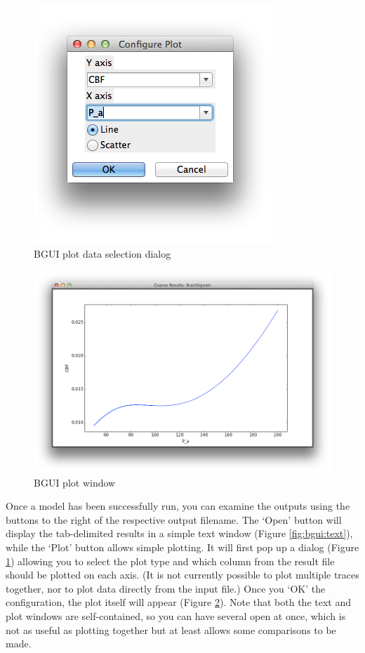 \documentclass[a4paper,11pt]{article}
\begin{document}
\begin{figure}[tbph]
\begin{center}
\includegraphics[scale=0.7]{figures/plot-select.png}
\caption{BGUI plot data selection dialog}
\label{fig:bgui:choose}
\end{center}
\end{figure}

\begin{figure}[tbph]
\begin{center}
\includegraphics[scale=0.5]{figures/plot.png}
\caption{BGUI plot window}
\label{fig:bgui:plot}
\end{center}
\end{figure}

Once a model has been successfully run, you can examine the outputs using the buttons to the right of the respective output filename. The `Open' button will display the tab-delimited results in a simple text window (Figure \ref{fig:bgui:text}), while the `Plot' button allows simple plotting. It will first pop up a dialog (Figure \ref{fig:bgui:choose}) allowing you to select the plot type and which column from the result file should be plotted on each axis. (It is not currently possible to plot multiple traces together, nor to plot data directly from the input file.) Once you `OK' the configuration, the plot itself will appear (Figure \ref{fig:bgui:plot}). Note that both the text and plot windows are self-contained, so you can have several open at once, which is not as useful as plotting together but at least allows some comparisons to be made.
\end{document}
